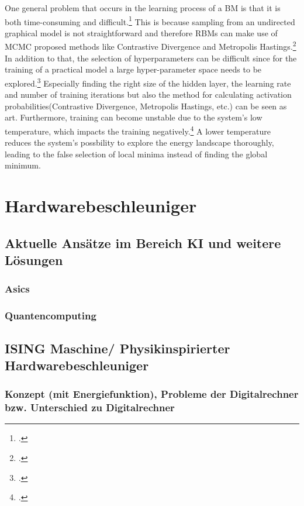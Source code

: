 One general problem that occurs in the learning process of a \ac{BM} is that it is both time-consuming and difficult.\footcite[Vgl.][1-2]{fischerIntroductionRestrictedBoltzmann2012}
This is because sampling from an undirected graphical model is not straightforward and therefore \ac{RBM}s can make use
of \ac{MCMC} proposed methods like Contrastive Divergence and Metropolis Hastings.\footcite[Vgl.][2]{fischerIntroductionRestrictedBoltzmann2012}
In addition to that, the selection of hyperparameters can be difficult since for the training of a practical model a large hyper-parameter space needs to be explored.\footcite[Vgl.][536]{larochelleClassificationUsingDiscriminative2008}
Especially finding the right size of the hidden layer, the learning rate and number of training iterations but also the method for calculating activation probabilities(Contrastive Divergence, Metropolis Hastings, etc.) can be seen as art.
Furthermore, training can become unstable due to the system's low temperature, which impacts the training negatively.\footcite[Vgl.][3-4]{huembeliPhysicsEnergybasedModels2022}
A lower temperature reduces the system's possbility to explore the energy landscape thoroughly, leading to the false selection of local minima instead of finding the global minimum.

\section{Hardwarebeschleuniger}
\subsection{Aktuelle Ansätze im Bereich KI und weitere Lösungen}
\subsubsection{Asics}
\subsubsection{Quantencomputing}
\subsection{ISING Maschine/ Physikinspirierter Hardwarebeschleuniger}
\subsubsection{Konzept (mit Energiefunktion), Probleme der Digitalrechner bzw. Unterschied zu Digitalrechner}
